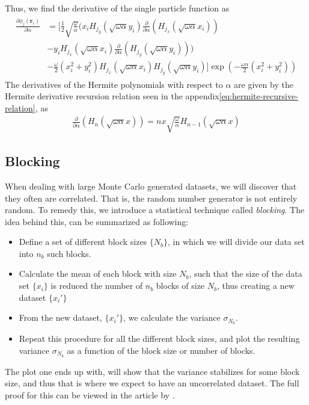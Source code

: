 \documentclass[11pt]{article}
\begin{document}
Thus, we find the derivative of the single particle function as
\begin{align}
	\begin{split}
		\frac{\partial \phi_j(\mathbf{r}_i)}{\partial \alpha} &= \bigg[ \frac{1}{2}\sqrt{\frac{\omega}{\alpha}}\bigg( x_i H_{j_y} (\sqrt{\omega\alpha} y_i) \frac{\partial}{\partial \alpha}\left( H_{j_x} (\sqrt{\omega\alpha}x_i) \right) \\
		&- y_i H_{j_x} (\sqrt{\omega\alpha}x_i) \frac{\partial}{\partial \alpha}\left( H_{j_y} (\sqrt{\omega\alpha}y_i) \right)\bigg) \\
		&- \frac{\omega}{2}(x_i^2 + y_i^2) H_{j_x} (\sqrt{\omega\alpha}x_i) H_{j_y} (\sqrt{\omega\alpha} y_i) \bigg] \exp{\left(-\frac{\omega\alpha}{2}\left( x_i^2 + y_i^2 \right)\right)}
	\end{split}
	\label{eq:wf-sp-alpha-derivative}
\end{align}
The derivatives of the Hermite polynomials with respect to $\alpha$ are given by the Hermite derivative recursion relation seen in the appendix\eqref{eq:hermite-recursive-relation}, as
\begin{align}
	\frac{\partial}{\partial\alpha} \left(H_n(\sqrt{\omega\alpha}x)\right) = nx\sqrt{\frac{\omega}{\alpha}} H_{n-1}(\sqrt{\omega\alpha}x)
	\label{eq:hermite-alpha-derivative}
\end{align}

\subsection{Blocking}
When dealing with large Monte Carlo generated datasets, we will discover that they often are correlated. That is, the random number generator is not entirely random. To remedy this, we introduce a statistical technique called \textit{blocking}. The idea behind this, can be summarized as following:
\begin{itemize}
	\item Define a set of different block sizes $\{N_b\}$, in which we will divide our data set into $n_b$ such blocks.
	\item Calculate the mean of each block with size $N_b$, such that the size of the data set $\{x_i\}$ is reduced the number of $n_b$ blocks of size $N_b$, thus creating a new dataset $\{x_i'\}$
	\item From the new dataset, $\{x_i'\}$, we calculate the variance $\sigma_{N_b}$.
	\item Repeat this procedure for all the different block sizes, and plot the resulting variance $\sigma_{N_b}$ as a function of the block size or number of blocks.
\end{itemize}
The plot one ends up with, will show that the variance stabilizes for some block size, and thus that is where we expect to have an uncorrelated dataset. The full proof for this can be viewed in the article by \citet{flyvbjerg1989error}.
\end{document}
